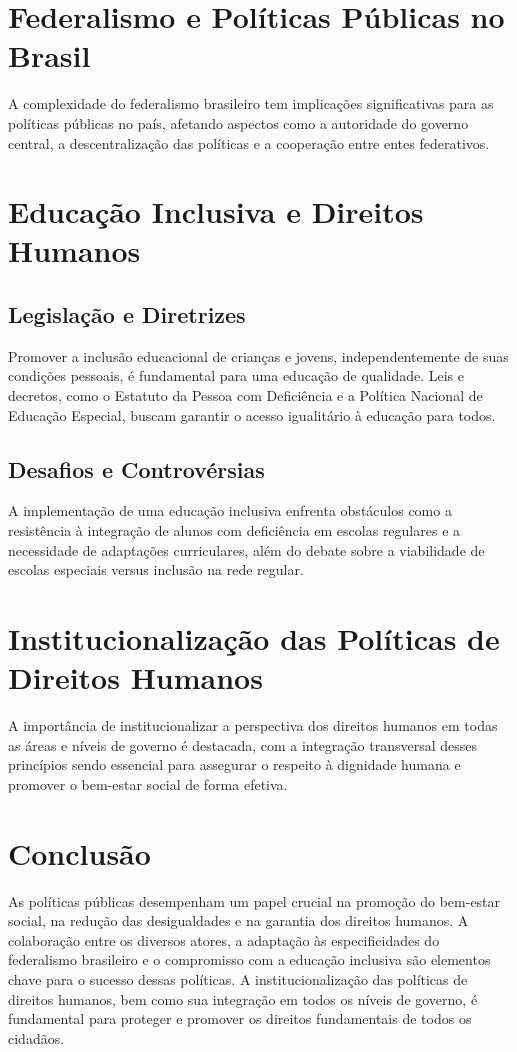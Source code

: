 \documentclass[
   article,       
   12pt,          
   oneside,       
   a4paper,       
   english,       
   brazil,        
   sumario=tradicional
   ]{abntex2}
\begin{document}
\section{Federalismo e Políticas Públicas no Brasil}
A complexidade do federalismo brasileiro tem implicações significativas para as políticas públicas no país, afetando aspectos como a autoridade do governo central, a descentralização das políticas e a cooperação entre entes federativos.

\section{Educação Inclusiva e Direitos Humanos}
\subsection{Legislação e Diretrizes}
Promover a inclusão educacional de crianças e jovens, independentemente de suas condições pessoais, é fundamental para uma educação de qualidade. Leis e decretos, como o Estatuto da Pessoa com Deficiência e a Política Nacional de Educação Especial, buscam garantir o acesso igualitário à educação para todos.

\subsection{Desafios e Controvérsias}
A implementação de uma educação inclusiva enfrenta obstáculos como a resistência à integração de alunos com deficiência em escolas regulares e a necessidade de adaptações curriculares, além do debate sobre a viabilidade de escolas especiais versus inclusão na rede regular.

\section{Institucionalização das Políticas de Direitos Humanos}
A importância de institucionalizar a perspectiva dos direitos humanos em todas as áreas e níveis de governo é destacada, com a integração transversal desses princípios sendo essencial para assegurar o respeito à dignidade humana e promover o bem-estar social de forma efetiva.

\section{Conclusão}
As políticas públicas desempenham um papel crucial na promoção do bem-estar social, na redução das desigualdades e na garantia dos direitos humanos. A colaboração entre os diversos atores, a adaptação às especificidades do federalismo brasileiro e o compromisso com a educação inclusiva são elementos chave para o sucesso dessas políticas. A institucionalização das políticas de direitos humanos, bem como sua integração em todos os níveis de governo, é fundamental para proteger e promover os direitos fundamentais de todos os cidadãos.
\end{document}
